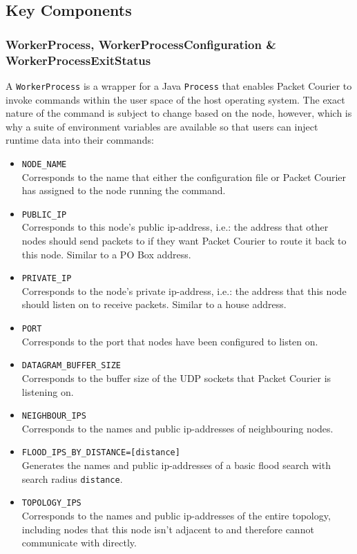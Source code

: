 \subsection{Key Components}\label{subsection:key_components}

\subsubsection{WorkerProcess, WorkerProcessConfiguration \&
WorkerProcessExitStatus}\label{subsubsection:worker_process_worker_process_configuration_and_worker_process_exit_status}

A \texttt{WorkerProcess} is a wrapper for a Java \texttt{Process}\cite{java_Process} that enables Packet Courier to
invoke commands within the user space of the host operating system. The exact nature of the command is subject to
change based on the node, however, which is why a suite of environment variables are available so that users can
inject runtime data into their commands:
\begin{itemize}
    \item \texttt{NODE\_NAME} \\
    Corresponds to the name that either the configuration file or Packet Courier has assigned to the node running the
    command.
    \item \texttt{PUBLIC\_IP} \\
    Corresponds to this node's public ip-address, i.e.: the address that other nodes should send packets to if they
    want Packet Courier to route it back to this node. Similar to a PO Box address.
    \item \texttt{PRIVATE\_IP} \\
    Corresponds to the node's private ip-address, i.e.: the address that this node should listen on to receive
    packets. Similar to a house address.
    \item \texttt{PORT} \\
    Corresponds to the port that nodes have been configured to listen on.
    \item \texttt{DATAGRAM\_BUFFER\_SIZE} \\
    Corresponds to the buffer size of the UDP sockets that Packet Courier is listening on.
    \item \texttt{NEIGHBOUR\_IPS} \\
    Corresponds to the names and public ip-addresses of neighbouring nodes.
    \item \texttt{FLOOD\_IPS\_BY\_DISTANCE=[distance]} \\
    Generates the names and public ip-addresses of a basic flood search with search radius \texttt{distance}.
    \item \texttt{TOPOLOGY\_IPS} \\
    Corresponds to the names and public ip-addresses of the entire topology, including nodes that this node isn't
    adjacent to and therefore cannot communicate with directly.
\end{itemize}

